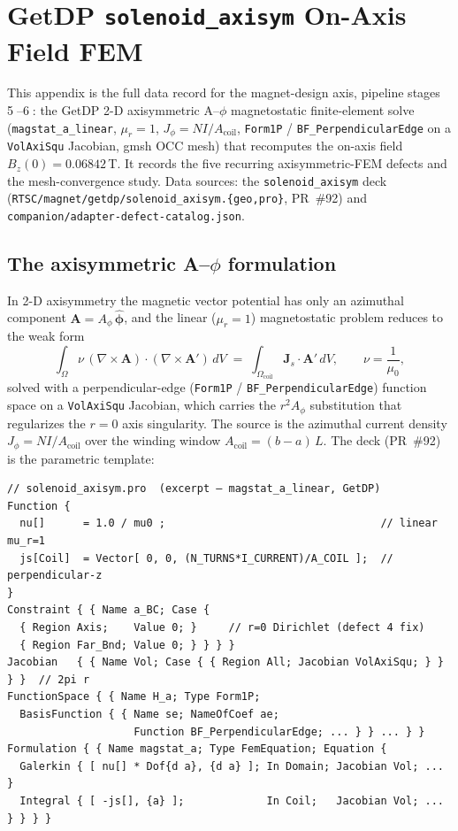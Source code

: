 \section{GetDP \texttt{solenoid\_axisym} On-Axis Field FEM}
\label{app:getdp}

This appendix is the full data record for the magnet-design axis,
pipeline stages \textcircled{\scriptsize 5}--\textcircled{\scriptsize 6}:
the GetDP \citep{getdp} 2-D axisymmetric A--$\phi$ magnetostatic
finite-element solve (\texttt{magstat\_a\_linear}, $\mu_r\!=\!1$,
$J_\phi\!=\!NI/A_{\text{coil}}$, \texttt{Form1P} /
\texttt{BF\_PerpendicularEdge} on a \texttt{VolAxiSqu} Jacobian, gmsh
\citep{geuzaine2009} OCC mesh) that recomputes the on-axis field
$B_z(0)\!=\!0.06842$\,T. It records the five recurring axisymmetric-FEM
defects and the mesh-convergence study. Data sources: the
\texttt{solenoid\_axisym} deck
(\texttt{RTSC/magnet/getdp/solenoid\_axisym.\{geo,pro\}}, PR~\#92) and
\texttt{companion/adapter-defect-catalog.json}.

\subsection{The axisymmetric A--$\phi$ formulation}
\label{app:getdp-form}

In 2-D axisymmetry the magnetic vector potential has only an azimuthal
component $\mathbf{A}=A_\phi\,\hat{\boldsymbol\phi}$, and the linear
($\mu_r=1$) magnetostatic problem reduces to the weak form
\begin{equation}
\int_\Omega \nu\,(\nabla\times\mathbf{A})\cdot(\nabla\times\mathbf{A}')\,
  dV
  \;=\;
  \int_{\Omega_{\text{coil}}} \mathbf{J}_s\cdot\mathbf{A}'\,dV,
\qquad \nu=\frac{1}{\mu_0},
\label{eq:weak}
\end{equation}
solved with a perpendicular-edge (\texttt{Form1P} /
\texttt{BF\_PerpendicularEdge}) function space on a \texttt{VolAxiSqu}
Jacobian, which carries the $r^2A_\phi$ substitution that regularizes the
$r\!=\!0$ axis singularity. The source is the azimuthal current density
$J_\phi=NI/A_{\text{coil}}$ over the winding window
$A_{\text{coil}}=(b-a)\,L$. The deck (PR~\#92) is the parametric template:

\begin{lstlisting}
// solenoid_axisym.pro  (excerpt — magstat_a_linear, GetDP)
Function {
  nu[]      = 1.0 / mu0 ;                                  // linear mu_r=1
  js[Coil]  = Vector[ 0, 0, (N_TURNS*I_CURRENT)/A_COIL ];  // perpendicular-z
}
Constraint { { Name a_BC; Case {
  { Region Axis;    Value 0; }     // r=0 Dirichlet (defect 4 fix)
  { Region Far_Bnd; Value 0; } } } }
Jacobian   { { Name Vol; Case { { Region All; Jacobian VolAxiSqu; } } } }  // 2pi r
FunctionSpace { { Name H_a; Type Form1P;
  BasisFunction { { Name se; NameOfCoef ae;
                    Function BF_PerpendicularEdge; ... } } ... } }
Formulation { { Name magstat_a; Type FemEquation; Equation {
  Galerkin { [ nu[] * Dof{d a}, {d a} ]; In Domain; Jacobian Vol; ... }
  Integral { [ -js[], {a} ];             In Coil;   Jacobian Vol; ... } } } }
\end{lstlisting}


